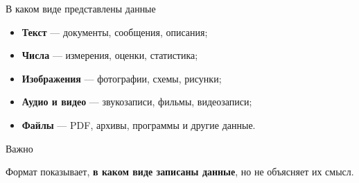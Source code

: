 \documentclass[aspectratio=169]{beamer}
\begin{document}
\begin{frame}{В каком виде представлены данные}

\begin{itemize}

    \item \textbf{Текст} — документы, сообщения, описания;
    
    \item \textbf{Числа} — измерения, оценки, статистика;
    
    \item \textbf{Изображения} — фотографии, схемы, рисунки;
    
    \item \textbf{Аудио и видео} — звукозаписи, фильмы, видеозаписи;
    
    \item \textbf{Файлы} — PDF, архивы, программы и другие данные.

\end{itemize}

\vspace{0.4cm}

\begin{alertblock}{Важно}

Формат показывает, \textbf{в каком виде записаны данные}, но не объясняет их смысл.

\end{alertblock}

\end{frame}


\end{document}
